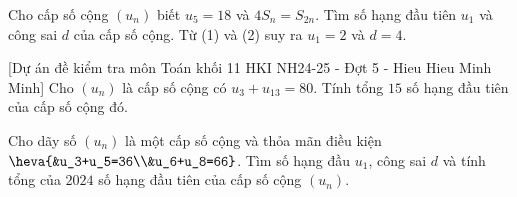 \begin{ex}%
	Cho cấp số cộng $\left(u_{n}\right)$ biết $u_{5}=18$ và $4 S_{n}=S_{2 n}$. Tìm số hạng đầu tiên $u_{1}$ và công  sai $d$ của cấp số cộng.
	Từ (1) và (2) suy ra $u_{1}=2$ và $d=4$. 
\end{ex}

\begin{bt}%
[Dự án đề kiểm tra môn Toán khối 11 HKI NH24-25 - Đợt 5 - Hieu Hieu Minh Minh]%
	Cho $(u_n)$ là cấp số cộng có $u_3+ u_{13} = 80$. Tính tổng $15$ số hạng đầu tiên của cấp số cộng đó.
\end{bt}

\begin{bt}%
	Cho dãy số $(u_n)$ là một cấp số cộng và thỏa mãn điều kiện $\heva{&u_3+u_5=36\\&u_6+u_8=66}$. Tìm số hạng đầu $u_1$, công sai $d$ và tính tổng của $2024$ số hạng đầu tiên của cấp số cộng $\left(u_n\right)$.
	
\end{bt}

